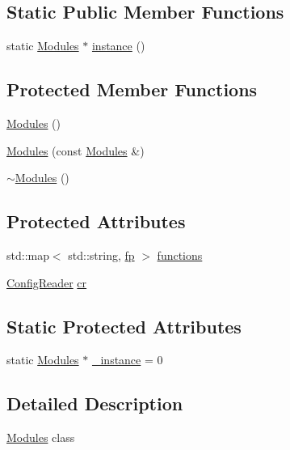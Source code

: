 \subsection*{Static Public Member Functions}
\begin{DoxyCompactItemize}
\item 
static \hyperlink{class_modules}{Modules} $\ast$ \hyperlink{class_modules_a89c623a11268379d1f8516434d775460}{instance} ()
\end{DoxyCompactItemize}
\subsection*{Protected Member Functions}
\begin{DoxyCompactItemize}
\item 
\hyperlink{class_modules_a5beb72cecb96b6f1f53df16451bda24c}{Modules} ()
\item 
\hyperlink{class_modules_a48ae2b32b914d75ce26cd9886cc07ffc}{Modules} (const \hyperlink{class_modules}{Modules} \&)
\item 
\hyperlink{class_modules_a155d288c001da10d23fe918f6c065a97}{$\sim$\+Modules} ()
\end{DoxyCompactItemize}
\subsection*{Protected Attributes}
\begin{DoxyCompactItemize}
\item 
std\+::map$<$ std\+::string, \hyperlink{_modules_8hpp_ab9dff9a0870eba3247a74a386629294f}{fp} $>$ \hyperlink{class_modules_a96b175e7cd625d536d12f9c5e4aa8318}{functions}
\item 
\hyperlink{class_config_reader}{Config\+Reader} \hyperlink{class_modules_a26598b42bad97f63a6662078afb61af4}{cr}
\end{DoxyCompactItemize}
\subsection*{Static Protected Attributes}
\begin{DoxyCompactItemize}
\item 
static \hyperlink{class_modules}{Modules} $\ast$ \hyperlink{class_modules_ad82835853c834bfec3aa53da4b75def4}{\+\_\+instance} = 0
\end{DoxyCompactItemize}


\subsection{Detailed Description}
\hyperlink{class_modules}{Modules} class 

